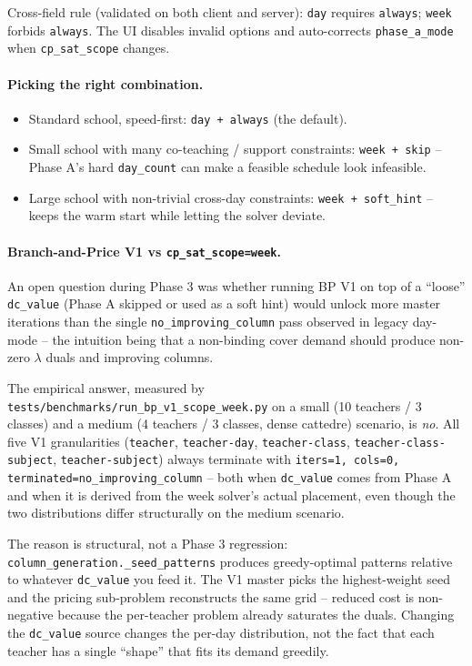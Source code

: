 Cross-field rule (validated on both client and server): \texttt{day} requires \texttt{always}; \texttt{week} forbids \texttt{always}. The UI disables invalid options and auto-corrects \texttt{phase\_a\_mode} when \texttt{cp\_sat\_scope} changes.

\paragraph{Picking the right combination.}
\begin{itemize}
  \item Standard school, speed-first: \texttt{day + always} (the default).
  \item Small school with many co-teaching / support constraints: \texttt{week + skip} -- Phase A's hard \texttt{day\_count} can make a feasible schedule look infeasible.
  \item Large school with non-trivial cross-day constraints: \texttt{week + soft\_hint} -- keeps the warm start while letting the solver deviate.
\end{itemize}

\paragraph{Branch-and-Price V1 vs \texttt{cp\_sat\_scope=week}.}
An open question during Phase 3 was whether running BP V1 on top of a ``loose'' \texttt{dc\_value} (Phase A skipped or used as a soft hint) would unlock more master iterations than the single \texttt{no\_improving\_column} pass observed in legacy day-mode -- the intuition being that a non-binding cover demand should produce non-zero $\lambda$ duals and improving columns.

The empirical answer, measured by \texttt{tests/benchmarks/run\_bp\_v1\_scope\_week.py} on a small (10 teachers / 3 classes) and a medium (4 teachers / 3 classes, dense cattedre) scenario, is \emph{no}. All five V1 granularities (\texttt{teacher}, \texttt{teacher-day}, \texttt{teacher-class}, \texttt{teacher-class-subject}, \texttt{teacher-subject}) always terminate with \texttt{iters=1, cols=0, terminated=no\_improving\_column} -- both when \texttt{dc\_value} comes from Phase A and when it is derived from the week solver's actual placement, even though the two distributions differ structurally on the medium scenario.

The reason is structural, not a Phase 3 regression: \texttt{column\_generation.\_seed\_patterns} produces greedy-optimal patterns relative to whatever \texttt{dc\_value} you feed it. The V1 master picks the highest-weight seed and the pricing sub-problem reconstructs the same grid -- reduced cost is non-negative because the per-teacher problem already saturates the duals. Changing the \texttt{dc\_value} source changes the per-day distribution, not the fact that each teacher has a single ``shape'' that fits its demand greedily.

